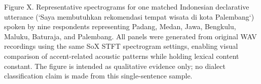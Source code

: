 \caption{Figure X. Representative spectrograms for one matched Indonesian declarative utterance (`Saya membutuhkan rekomendasi tempat wisata di kota Palembang`) spoken by nine respondents representing Padang, Medan, Jawa, Bengkulu, Maluku, Baturaja, and Palembang. All panels were generated from original WAV recordings using the same SoX STFT spectrogram settings, enabling visual comparison of accent-related acoustic patterns while holding lexical content constant. The figure is intended as qualitative evidence only; no dialect classification claim is made from this single-sentence sample.}
